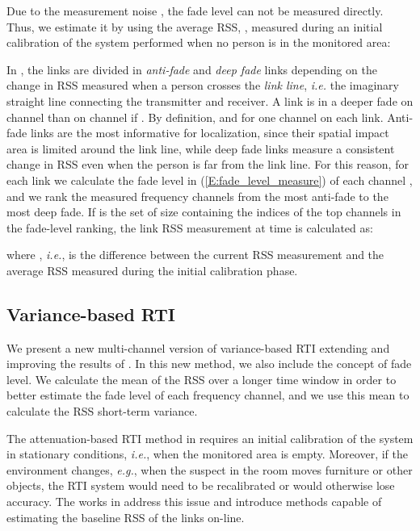\documentclass[conference]{IEEEtran}
\begin{document}
Due to the measurement noise , the fade level can not be
measured directly. Thus, we estimate it by using the average RSS,
, measured during an initial calibration of the system
performed when no person is in the monitored area:


In \cite{Wilson_SkewL_2011}, the links are divided in \emph{anti-fade}
and \emph{deep fade} links depending on the change in RSS measured
when a person crosses the \emph{link line}, \emph{i.e.} the imaginary
straight line connecting the transmitter and receiver. A link is in a
deeper fade on channel  than on channel  if . By definition,  and
 for one channel  on each link. Anti-fade links
are the most informative for localization, since their spatial impact
area is limited around the link line, while deep fade links measure a
consistent change in RSS even when the person is far from the link
line. For this reason, for each link  we calculate the fade level
in (\ref{E:fade_level_measure}) of each channel ,
and we rank the measured frequency channels from the most anti-fade to
the most deep fade. If  is the set of size 
containing the indices of the  top channels in the fade-level
ranking, the link RSS measurement  at time  is calculated as:

where , \emph{i.e.},
 is the difference between the current RSS
measurement and the average RSS measured during the initial
calibration phase.



\subsection{Variance-based RTI} \label{sec:variance_based_RTI}

We present a new multi-channel version of variance-based RTI extending
and improving the results of \cite{Wilson_VRTI_2011}. In this new
method, we also include the concept of fade level. We calculate the
mean of the RSS over a longer time window in order to better estimate
the fade level of each frequency channel, and we use this mean to
calculate the RSS short-term variance.

The attenuation-based RTI method in \cite{MASS} requires an initial
calibration of the system in stationary conditions, \emph{i.e.}, when
the monitored area is empty. Moreover, if the environment changes,
\emph{e.g.}, when the suspect in the room moves furniture or other
objects, the RTI system would need to be recalibrated or would
otherwise lose accuracy. The works in
\cite{Grandma_2012,Edelstein_2010} address this issue and introduce
methods capable of estimating the baseline RSS of the links on-line.
\end{document}
